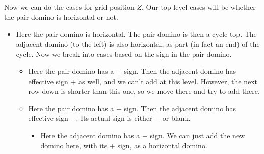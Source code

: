\documentclass[12pt]{article}
\numberwithin{equation}{section}
\newcommand{\horizontalDominoMaybe}[3]{\filldraw [dominoMaybeStyle] (#2 - 1 + \eps, #1 - 1 + \eps) rectangle + (2 - \teps, 1 -\teps) node [dominoText] {$#3$};}
\newcommand{\verticalDominoMaybeShift}[4]{\filldraw [dominoMaybeStyle] (#2 - 1 + #4 + \eps,  #1 - 1 + \eps) rectangle + (1 - \teps,2 -\teps) node [dominoText] {$#3$};}
\begin{document}
  Now we can do the cases for grid position $Z$.
  Our top-level cases will be whether the pair domino is horizontal or not.
  \begin{itemize}
    \item Here the pair domino is horizontal.
    The pair domino is then a cycle top.
    The adjacent domino (to the left) is also horizontal, as part (in fact an end) of the cycle.
    Now we break into cases based on the sign in the pair domino.
    \begin{itemize}
      \item Here the pair domino has a $+$ sign.
      Then the adjacent domino has effective sign $+$ as well, and we can't add at this level.
      However, the next row down is shorter than this one, so we move there and try to add there.
      \item Here the pair domino has a $-$ sign.
      Then the adjacent domino has effective sign $-$.
      Its actual sign is either $-$ or blank.
      \begin{itemize}
        \item Here the adjacent domino has a $-$ sign.
        We can just add the new domino here, with its $+$ sign, as a horizontal domino.
        \begin{figure}[H]
          \centering
        \end{figure}


\end{itemize}
\end{itemize}
\end{itemize}
\end{document}
